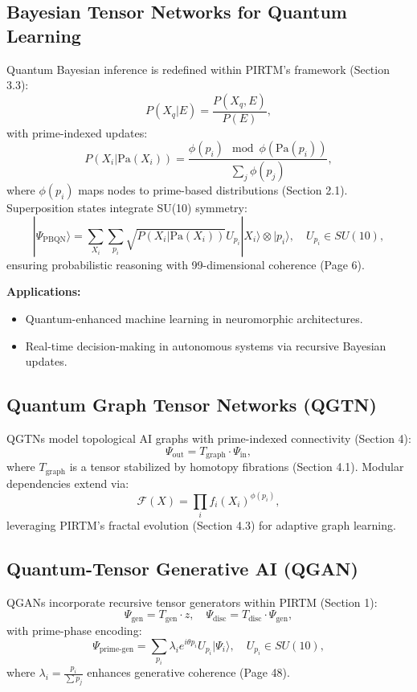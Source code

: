 \documentclass{article}
\theoremstyle{plain}
\begin{document}
\subsection{Bayesian Tensor Networks for Quantum Learning}
Quantum Bayesian inference is redefined within PIRTM’s framework (Section 3.3):
\begin{equation}
P(X_q | E) = \frac{P(X_q, E)}{P(E)},
\end{equation}
with prime-indexed updates:
\begin{equation}
P(X_i | \text{Pa}(X_i)) = \frac{\phi(p_i) \mod \phi(\text{Pa}(p_i))}{\sum_{j} \phi(p_j)},
\end{equation}
where \( \phi(p_i) \) maps nodes to prime-based distributions (Section 2.1). Superposition states integrate SU(10) symmetry:
\begin{equation}
|\Psi_{\text{PBQN}}\rangle = \sum_{X_i} \sum_{p_i} \sqrt{P(X_i | \text{Pa}(X_i))} U_{p_i} |X_i\rangle \otimes |p_i\rangle, \quad U_{p_i} \in SU(10),
\end{equation}
ensuring probabilistic reasoning with 99-dimensional coherence (Page 6).

\textbf{Applications:}
\begin{itemize}
    \item Quantum-enhanced machine learning in neuromorphic architectures.
    \item Real-time decision-making in autonomous systems via recursive Bayesian updates.
\end{itemize}

\subsection{Quantum Graph Tensor Networks (QGTN)}
QGTNs model topological AI graphs with prime-indexed connectivity (Section 4):
\begin{equation}
\Psi_{\text{out}} = T_{\text{graph}} \cdot \Psi_{\text{in}},
\end{equation}
where \( T_{\text{graph}} \) is a tensor stabilized by homotopy fibrations (Section 4.1). Modular dependencies extend via:
\begin{equation}
\mathcal{F}(X) = \prod_{i} f_i(X_i)^{\phi(p_i)},
\end{equation}
leveraging PIRTM’s fractal evolution (Section 4.3) for adaptive graph learning.

\subsection{Quantum-Tensor Generative AI (QGAN)}
QGANs incorporate recursive tensor generators within PIRTM (Section 1):
\begin{equation}
\Psi_{\text{gen}} = T_{\text{gen}} \cdot z, \quad \Psi_{\text{disc}} = T_{\text{disc}} \cdot \Psi_{\text{gen}},
\end{equation}
with prime-phase encoding:
\begin{equation}
\Psi_{\text{prime-gen}} = \sum_{p_i} \lambda_i e^{i \theta p_i} U_{p_i} |\Psi_i\rangle, \quad U_{p_i} \in SU(10),
\end{equation}
where \( \lambda_i = \frac{p_i}{\sum p_j} \) enhances generative coherence (Page 48).
\end{document}
